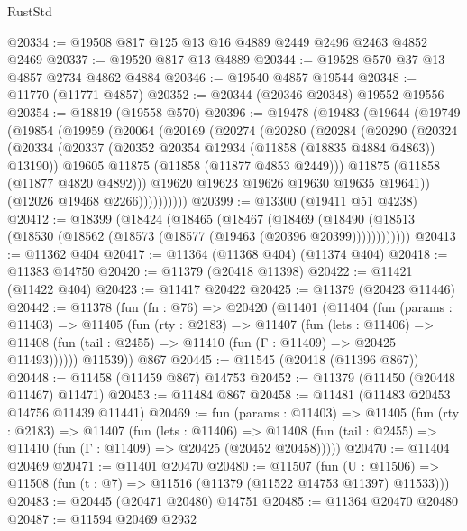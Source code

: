 \begin{lexlean}{RustStd}
\begin{coremodule}
@20334 := @19508 @817 @125 @13 @16 @4889 @2449 @2496 @2463 @4852 @2469
@20337 := @19520 @817 @13 @4889
@20344 := @19528 @570 @37 @13 @4857 @2734 @4862 @4884
@20346 := @19540 @4857 @19544
@20348 := @11770 (@11771 @4857)
@20352 := @20344 (@20346 @20348) @19552 @19556
@20354 := @18819 (@19558 @570)
@20396 := @19478
    (@19483
      (@19644
        (@19749
          (@19854
            (@19959
              (@20064
                (@20169
                  (@20274
                    (@20280
                      (@20284
                        (@20290
                          (@20324
                            (@20334
                              (@20337 (@20352 @20354 @12934 (@11858 (@18835 @4884 @4863)) @13190))
                              @19605
                              @11875
                              (@11858 (@11877 @4853 @2449)))
                            @11875
                            (@11858 (@11877 @4820 @4892)))
                          @19620
                          @19623
                          @19626
                          @19630
                          @19635
                          @19641))
                      (@12026 @19468 @2266))))))))))
@20399 := @13300 (@19411 @51 @4238)
@20412 := @18399
    (@18424
      (@18465
        (@18467
          (@18469 (@18490 (@18513 (@18530 (@18562 (@18573 (@18577 (@19463 (@20396 @20399))))))))))))
@20413 := @11362 @404
@20417 := @11364 (@11368 @404) (@11374 @404)
@20418 := @11383 @14750
@20420 := @11379 (@20418 @11398)
@20422 := @11421 (@11422 @404)
@20423 := @11417 @20422
@20425 := @11379 (@20423 @11446)
@20442 := @11378
    (fun (fn : @76) =>
    @20420
      (@11401
        (@11404
          (fun (params : @11403) =>
          @11405
            (fun (rty : @2183) =>
            @11407
              (fun (lets : @11406) =>
              @11408 (fun (tail : @2455) => @11410 (fun (Γ : @11409) => @20425 @11493))))))
        @11539))
    @867
@20445 := @11545 (@20418 (@11396 @867))
@20448 := @11458 (@11459 @867) @14753
@20452 := @11379 (@11450 (@20448 @11467) @11471)
@20453 := @11484 @867
@20458 := @11481 (@11483 @20453 @14756 @11439 @11441)
@20469 := fun (params : @11403) =>
  @11405
    (fun (rty : @2183) =>
    @11407
      (fun (lets : @11406) =>
      @11408 (fun (tail : @2455) => @11410 (fun (Γ : @11409) => @20425 (@20452 @20458)))))
@20470 := @11404 @20469
@20471 := @11401 @20470
@20480 := @11507
    (fun (U : @11506) => @11508 (fun (t : @7) => @11516 (@11379 (@11522 @14753 @11397) @11533)))
@20483 := @20445 (@20471 @20480) @14751
@20485 := @11364 @20470 @20480
@20487 := @11594 @20469 @2932

\end{coremodule}
\end{lexlean}
